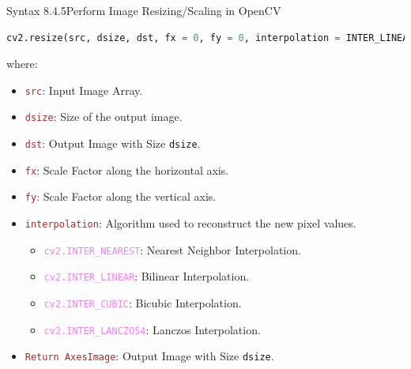 \documentclass{book}
\begin{document}
\begin{synBox}{Syntax 8.4.5}{Perform Image Resizing/Scaling in OpenCV}
    \begin{lstlisting}[language=Python, basicstyle=\ttfamily\small, keywordstyle=\color{blue}, commentstyle=\color{forestgreen}, stringstyle=\color{red}, showstringspaces=false]
            cv2.resize(src, dsize, dst, fx = 0, fy = 0, interpolation = INTER_LINEAR)
    \end{lstlisting}
    where:
    \begin{itemize}
        \item \textcolor{brown}{\texttt{src}}: Input Image Array.
        \item \textcolor{brown}{\texttt{dsize}}: Size of the output image.
        \item \textcolor{brown}{\texttt{dst}}: Output Image with Size \texttt{dsize}.
        \item \textcolor{brown}{\texttt{fx}}: Scale Factor along the horizontal axis.
        \item \textcolor{brown}{\texttt{fy}}: Scale Factor along the vertical axis.
        \item \textcolor{brown}{\texttt{interpolation}}: Algorithm used to reconstruct the new pixel values.
        \begin{itemize}
            \item \textcolor{violet}{\texttt{cv2.INTER\_NEAREST}}: Nearest Neighbor Interpolation.
            \item \textcolor{violet}{\texttt{cv2.INTER\_LINEAR}}: Bilinear Interpolation.
            \item \textcolor{violet}{\texttt{cv2.INTER\_CUBIC}}: Bicubic Interpolation.
            \item \textcolor{violet}{\texttt{cv2.INTER\_LANCZOS4}}: Lanczos Interpolation.
        \end{itemize}
        \item \textcolor{brown}{\texttt{Return AxesImage}}: Output Image with Size \texttt{dsize}.
    \end{itemize}
\end{synBox}
\end{document}
